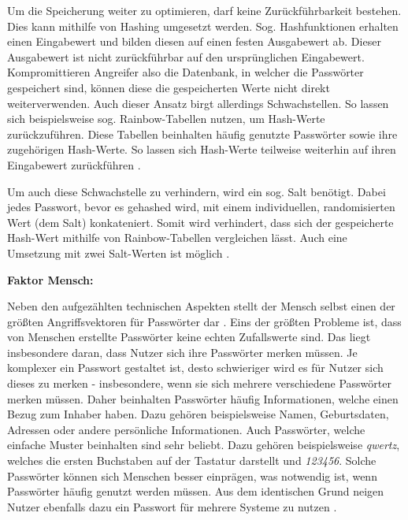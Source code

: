     Um die Speicherung weiter zu optimieren, darf keine Zurückführbarkeit bestehen. Dies kann mithilfe von Hashing umgesetzt werden. Sog. Hashfunktionen erhalten einen Eingabewert und bilden diesen auf einen festen Ausgabewert ab. Dieser Ausgabewert ist nicht zurückführbar auf den ursprünglichen Eingabewert. Kompromittieren Angreifer also die Datenbank, in welcher die Passwörter gespeichert sind, können diese die gespeicherten Werte nicht direkt weiterverwenden. Auch dieser Ansatz birgt allerdings Schwachstellen. So lassen sich beispielsweise sog. Rainbow-Tabellen nutzen, um Hash-Werte zurückzuführen. Diese Tabellen beinhalten häufig genutzte Passwörter sowie ihre zugehörigen Hash-Werte. So lassen sich Hash-Werte teilweise weiterhin auf ihren Eingabewert zurückführen \cite{chanda2016password}.

    Um auch diese Schwachstelle zu verhindern, wird ein sog. Salt benötigt. Dabei jedes Passwort, bevor es gehashed wird, mit einem individuellen, randomisierten Wert (dem Salt) konkateniert. Somit wird verhindert, dass sich der gespeicherte Hash-Wert mithilfe von Rainbow-Tabellen vergleichen lässt. Auch eine Umsetzung mit zwei Salt-Werten ist möglich \cite{chanda2016password}.

\textbf{Faktor Mensch:}

Neben den aufgezählten technischen Aspekten stellt der Mensch selbst einen der größten Angriffsvektoren für Passwörter dar \cite{ives2004domino} \cite{yildirim2019encouraging}. Eins der größten Probleme ist, dass von Menschen erstellte Passwörter keine echten Zufallswerte sind. Das liegt insbesondere daran, dass Nutzer sich ihre Passwörter merken müssen. Je komplexer ein Passwort gestaltet ist, desto schwieriger wird es für Nutzer sich dieses zu merken - insbesondere, wenn sie sich mehrere verschiedene Passwörter merken müssen. Daher beinhalten Passwörter häufig Informationen, welche einen Bezug zum Inhaber haben. Dazu gehören beispielsweise Namen, Geburtsdaten, Adressen oder andere persönliche Informationen. Auch Passwörter, welche einfache Muster beinhalten sind sehr beliebt. Dazu gehören beispielsweise \textit{qwertz}, welches die ersten Buchstaben auf der Tastatur darstellt und \textit{123456}. Solche Passwörter können sich Menschen besser einprägen, was notwendig ist, wenn Passwörter häufig genutzt werden müssen. Aus dem identischen Grund neigen Nutzer ebenfalls dazu ein Passwort für mehrere Systeme zu nutzen \cite{chanda2016password} \cite{boonkrong2012security} \cite{yildirim2019encouraging}. 

